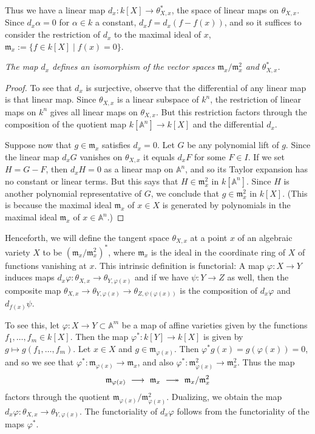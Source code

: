\documentclass[12pt]{amsart}
\begin{document}
Thus we have a  linear map $d_x\colon k[X]\to \theta_{X,x}^*$, the space of
linear maps on $\theta_{X,x}$.
Since $d_x \alpha=0$ for $\alpha\in k$ a constant,
$d_xf = d_x(f-f(x))$, and so it suffices to consider the restriction of
$d_x$ to the maximal ideal of $x$, 
${\mathfrak m}_x:=\{f\in k[X]\mid f(x)=0\}$.
\medskip

{\it 
The map $d_x$ defines an isomorphism of the vector spaces 
${\mathfrak m}_x/{\mathfrak m}^2_x$ and $\theta_{X,x}^*$.
}\medskip

\begin{proof}
To see that $d_x$ is surjective, observe that 
the differential of any linear map is that linear map.
Since $\theta_{X,x}$ is a linear subspace of $k^n$, the restriction of
linear maps on $k^n$ gives all linear maps on $\theta_{X,x}$.
But this restriction factors through the composition of the
quotient map $k[{\mathbb A}^n]\to k[X]$ and the differential $d_x$.


Suppose now that $g\in{\mathfrak m}_x$ satisfies $d_x=0$.
Let $G$ be any polynomial lift of $g$.
Since the linear map $d_xG$ vanishes on $\theta_{X,x}$ it equals $d_xF$ for
some $F\in I$. 
If we set $H=G-F$, then $d_xH=0$ as a linear map on ${\mathbb A}^n$, and so 
its Taylor expansion has no constant or linear terms.
But this says that $H\in{\mathfrak m}_x^2$ in $k[{\mathbb A}^n]$.
Since $H$ is another polynomial representative of $G$, we conclude that
$g\in{\mathfrak m}_x^2$ in $k[X]$. 
(This is because the maximal ideal ${\mathfrak m}_x$ of $x\in X$ is
generated by polynomials in the maximal ideal ${\mathfrak m}_x$ of 
$x\in {\mathbb A}^n$.)
\end{proof}


Henceforth, we will  define the tangent space $\theta_{X,x}$ at a point $x$
of an algebraic variety $X$ to be $({\mathfrak m}_x/{\mathfrak m}_x^2)^*$,
where ${\mathfrak m}_x$ is the ideal in the coordinate ring of $X$ of
functions vanishing at $x$.
This intrinsic definition is functorial:
A map $\varphi\colon X\to Y$ induces maps 
$d_x\varphi\colon \theta_{X,x}\to \theta_{Y,\varphi(x)}$
and if we have $\psi\colon Y\to Z$ as well, then 
the composite map 
$\theta_{X,x}\to \theta_{Y,\varphi(x)}\to \theta_{Z,\psi(\varphi(x))}$ is
the composition of $d_x\varphi$ and $d_{f(x)}\psi$.

To see this, let $\varphi\colon X\to Y\subset{\mathbb A}^m$ be a map of
affine varieties given by the functions $f_1,\ldots,f_m\in k[X]$.
Then the map $\varphi^*\colon k[Y]\to k[X]$ is given by
$g\mapsto g(f_1,\ldots,f_m)$.
Let $x\in X$ and $g\in{\mathfrak m}_{\varphi(x)}$.
Then $\varphi^*g(x)=g(\varphi(x))=0$, and so we see that 
$\varphi^*\colon {\mathfrak m}_{\varphi(x)}\to{\mathfrak m}_x$, and also
$\varphi^*\colon {\mathfrak m}^2_{\varphi(x)}\to{\mathfrak m}^2_x$.
Thus the map
$$
  {\mathfrak m}_{\varphi(x)}\ \longrightarrow\ 
  {\mathfrak m}_x\ \relbar\joinrel\twoheadrightarrow\ 
  {\mathfrak m}_x/{\mathfrak m}^2_x
$$
factors through the quotient 
${\mathfrak m}_{\varphi(x)}/{\mathfrak m}^2_{\varphi(x)}$.
Dualizing, we obtain the map
$d_x\varphi\colon \theta_{X,x}\to\theta_{Y,\varphi(x)}$.
The functoriality of $d_x\varphi$ follows from the functoriality of the maps
$\varphi^*$. 
\end{document}
